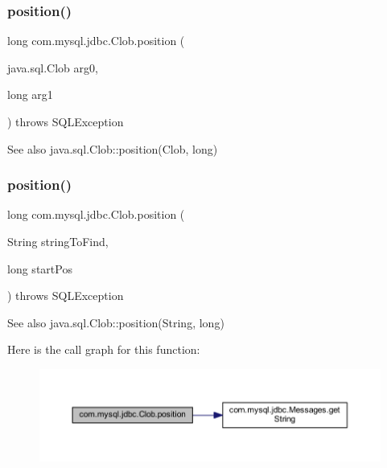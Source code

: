 \subsubsection{\texorpdfstring{position()}{position()}\hspace{0.1cm}{\footnotesize\ttfamily [1/2]}}
{\footnotesize\ttfamily long com.\+mysql.\+jdbc.\+Clob.\+position (\begin{DoxyParamCaption}\item[{java.\+sql.\+Clob}]{arg0,  }\item[{long}]{arg1 }\end{DoxyParamCaption}) throws S\+Q\+L\+Exception}

\begin{DoxySeeAlso}{See also}
java.\+sql.\+Clob\+::position(\+Clob, long) 
\end{DoxySeeAlso}
\mbox{\label{classcom_1_1mysql_1_1jdbc_1_1_clob_a7268e3140533003e4a4688da0abfe9e3}} 
\subsubsection{\texorpdfstring{position()}{position()}\hspace{0.1cm}{\footnotesize\ttfamily [2/2]}}
{\footnotesize\ttfamily long com.\+mysql.\+jdbc.\+Clob.\+position (\begin{DoxyParamCaption}\item[{String}]{string\+To\+Find,  }\item[{long}]{start\+Pos }\end{DoxyParamCaption}) throws S\+Q\+L\+Exception}

\begin{DoxySeeAlso}{See also}
java.\+sql.\+Clob\+::position(\+String, long) 
\end{DoxySeeAlso}
Here is the call graph for this function\+:\nopagebreak
\begin{figure}[H]
\begin{center}
\leavevmode
\includegraphics[width=350pt]{classcom_1_1mysql_1_1jdbc_1_1_clob_a7268e3140533003e4a4688da0abfe9e3_cgraph}
\end{center}
\end{figure}
\mbox{\label{classcom_1_1mysql_1_1jdbc_1_1_clob_a9c7635d9d09a1693f072576a818fca24}} 
